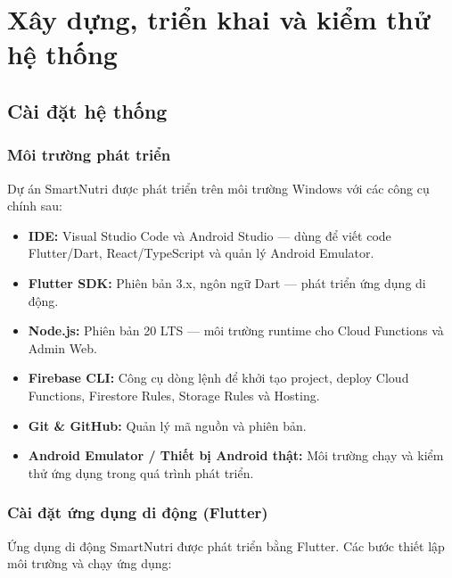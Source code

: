 
\chapter{Xây dựng, triển khai và kiểm thử hệ thống}

\section{Cài đặt hệ thống}

\subsection{Môi trường phát triển}

Dự án SmartNutri được phát triển trên môi trường Windows với các công cụ chính sau:

\begin{itemize}
    \item \textbf{IDE:} Visual Studio Code và Android Studio — dùng để viết code Flutter/Dart, React/TypeScript và quản lý Android Emulator.
    \item \textbf{Flutter SDK:} Phiên bản 3.x, ngôn ngữ Dart — phát triển ứng dụng di động.
    \item \textbf{Node.js:} Phiên bản 20 LTS — môi trường runtime cho Cloud Functions và Admin Web.
    \item \textbf{Firebase CLI:} Công cụ dòng lệnh để khởi tạo project, deploy Cloud Functions, Firestore Rules, Storage Rules và Hosting.
    \item \textbf{Git \& GitHub:} Quản lý mã nguồn và phiên bản.
    \item \textbf{Android Emulator / Thiết bị Android thật:} Môi trường chạy và kiểm thử ứng dụng trong quá trình phát triển.
\end{itemize}

\subsection{Cài đặt ứng dụng di động (Flutter)}

Ứng dụng di động SmartNutri được phát triển bằng Flutter. Các bước thiết lập môi trường và chạy ứng dụng:

